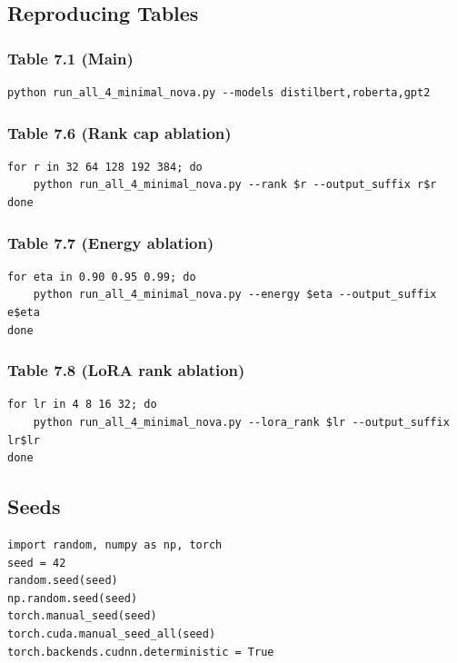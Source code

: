 \subsection{Reproducing Tables}

\subsubsection{Table 7.1 (Main)}

\begin{lstlisting}
python run_all_4_minimal_nova.py --models distilbert,roberta,gpt2
\end{lstlisting}

\subsubsection{Table 7.6 (Rank cap ablation)}

\begin{lstlisting}
for r in 32 64 128 192 384; do
    python run_all_4_minimal_nova.py --rank $r --output_suffix r$r
done
\end{lstlisting}

\subsubsection{Table 7.7 (Energy ablation)}

\begin{lstlisting}
for eta in 0.90 0.95 0.99; do
    python run_all_4_minimal_nova.py --energy $eta --output_suffix e$eta
done
\end{lstlisting}

\subsubsection{Table 7.8 (LoRA rank ablation)}

\begin{lstlisting}
for lr in 4 8 16 32; do
    python run_all_4_minimal_nova.py --lora_rank $lr --output_suffix lr$lr
done
\end{lstlisting}

\subsection{Seeds}

\begin{lstlisting}
import random, numpy as np, torch
seed = 42
random.seed(seed)
np.random.seed(seed)
torch.manual_seed(seed)
torch.cuda.manual_seed_all(seed)
torch.backends.cudnn.deterministic = True
\end{lstlisting}

